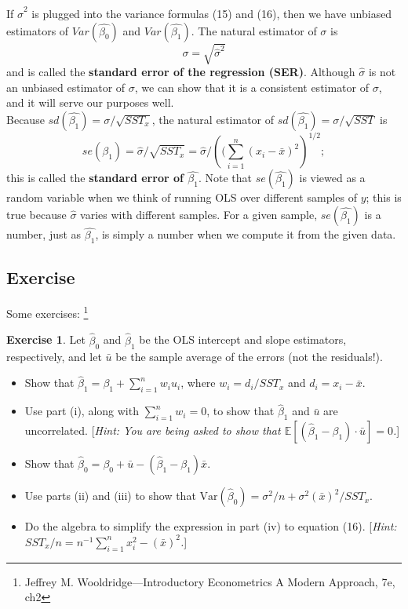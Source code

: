\documentclass[a4paper, 10pt]{article}
\theoremstyle{definition}	%
\newtheorem{exercise}{Exercise}
\begin{document}
If $\hat{\sigma}^2$ is plugged into the variance formulas (15) and (16), then we have unbiased estimators of $Var(\hat{\beta_0})$ and $Var(\hat{\beta_1})$. The natural estimator of $\sigma$ is
\begin{equation*}
    \sigma = \sqrt{\hat{\sigma}^2}
\end{equation*}
and is called the \textbf{standard error of the regression (SER)}. Although $\hat{\sigma}$ is not an unbiased estimator of $\sigma$, we can show that it is a consistent estimator of $\sigma$,
and it will serve our purposes well.\\
Because $sd(\hat{\beta_1}) = \sigma / \sqrt{SST_x}$, the natural estimator of $sd(\hat{\beta_1}) = \sigma / \sqrt{SST}$ is
\begin{equation*}
    se(\hat{\beta_1}) = \hat{\sigma} / \sqrt{SST_x} = \hat{\sigma} /\left( (\sum_{i=1}^{n}(x_i-\bar{x})^2\right)^{1/2} ;
\end{equation*}
this is called the \textbf{standard error of $\hat{\beta_1}$}. Note that $se(\hat{\beta_1})$ is viewed as a random variable when we think of running OLS over different samples of $y$; this is true because $\hat{\sigma}$ varies with different samples. For a given sample, $se(\hat{\beta_1})$ is a number, just as $\hat{\beta_1}$, is simply a number when we compute it from the given data.

\subsection{Exercise}
Some exercises: \footnote{Jeffrey M. Wooldridge---Introductory Econometrics A Modern Approach, 7e, ch2} 
\begin{exercise}
    Let $ \hat{\beta}_0 $ and $ \hat{\beta}_1 $ be the OLS intercept and slope estimators, respectively, and let $ \bar{u} $ be the sample average of the errors (not the residuals!).

\begin{itemize}
    \item[(i)] Show that $ \hat{\beta}_1 = \beta_1 + \sum_{i=1}^{n} w_i u_i $, where $ w_i = d_i / SST_x $ and $ d_i = x_i - \bar{x} $.

    \item[(ii)] Use part (i), along with $ \sum_{i=1}^{n} w_i = 0 $, to show that $ \hat{\beta}_1 $ and $ \bar{u} $ are uncorrelated. 
    [\textit{Hint: You are being asked to show that $ \mathbb{E}[(\hat{\beta}_1 - \beta_1) \cdot \bar{u}] = 0 $.}]
    \item[(iii)] Show that $ \hat{\beta}_0 = \beta_0 + \bar{u} - (\hat{\beta}_1 - \beta_1) \bar{x} $.
    \item[(iv)] Use parts (ii) and (iii) to show that $ \text{Var}(\hat{\beta}_0) = \sigma^2/n + \sigma^2 (\bar{x})^2 / SST_x $.
    \item[(v)] Do the algebra to simplify the expression in part (iv) to equation (16). 
    [\textit{Hint: $ SST_x / n = n^{-1} \sum_{i=1}^{n} x_i^2 - (\bar{x})^2 $.}]
\end{itemize}
\end{exercise}
\end{document}
